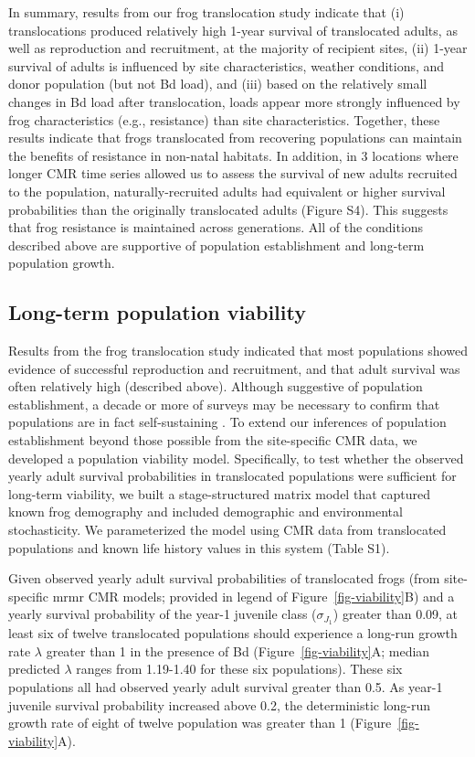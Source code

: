 \documentclass[9pt,twocolumn,twoside,lineno]{pnas-new}
\begin{document}
In summary, results from our frog translocation study indicate that (i)
translocations produced relatively high 1-year survival of translocated
adults, as well as reproduction and recruitment, at the majority of
recipient sites, (ii) 1-year survival of adults is influenced by site
characteristics, weather conditions, and donor population (but not Bd
load), and (iii) based on the relatively small changes in Bd load after
translocation, loads appear more strongly influenced by frog
characteristics (e.g., resistance) than site characteristics. Together,
these results indicate that frogs translocated from recovering
populations can maintain the benefits of resistance in non-natal
habitats. In addition, in 3 locations where longer CMR time series
allowed us to assess the survival of new adults recruited to the
population, naturally-recruited adults had equivalent or higher survival
probabilities than the originally translocated adults
(Figure S4). This suggests that frog
resistance is maintained across generations. All of the conditions
described above are supportive of population establishment and long-term
population growth.

\subsection*{Long-term population viability}

Results from the frog translocation study indicated that most
populations showed evidence of successful reproduction and recruitment,
and that adult survival was often relatively high (described above).
Although suggestive of population establishment, a decade or more of
surveys may be necessary to confirm that populations are in fact
self-sustaining \citep{joseph2018}. To extend our inferences of
population establishment beyond those possible from the site-specific
CMR data, we developed a population viability model. Specifically, to
test whether the observed yearly adult survival probabilities in
translocated populations were sufficient for long-term viability, we
built a stage-structured matrix model that captured known frog
demography and included demographic and environmental stochasticity. We
parameterized the model using CMR data from translocated populations and
known life history values in this system (Table S1).

Given observed yearly adult survival probabilities of translocated frogs
(from site-specific mrmr CMR models; provided in legend of
Figure~\ref{fig-viability}B) and a yearly survival probability of the
year-1 juvenile class (\(\sigma_{J_1}\)) greater than 0.09, at least six
of twelve translocated populations should experience a long-run growth
rate \(\lambda\) greater than 1 in the presence of Bd
(Figure~\ref{fig-viability}A; median predicted \(\lambda\) ranges from
1.19-1.40 for these six populations). These six populations all had
observed yearly adult survival greater than 0.5. As year-1 juvenile
survival probability increased above 0.2, the deterministic long-run
growth rate of eight of twelve population was greater than 1
(Figure~\ref{fig-viability}A).
\end{document}

